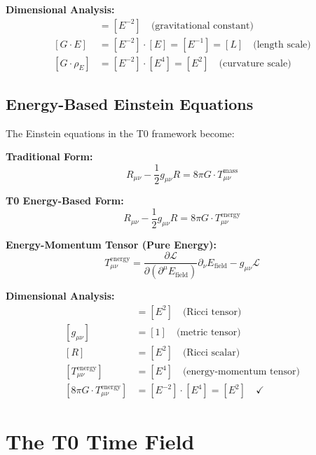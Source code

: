 \documentclass[12pt,a4paper]{report}
\begin{document}
	\textbf{Dimensional Analysis:}
	\begin{align}
		[G] &= [E^{-2}] \quad \text{(gravitational constant)} \\
		[G \cdot E] &= [E^{-2}] \cdot [E] = [E^{-1}] = [L] \quad \text{(length scale)} \\
		[G \cdot \rho_E] &= [E^{-2}] \cdot [E^4] = [E^2] \quad \text{(curvature scale)}
	\end{align}
	
	\subsection{Energy-Based Einstein Equations}
	\label{subsec:energy_einstein_equations}
	
	The Einstein equations in the T0 framework become:
	
	\textbf{Traditional Form:}
	\begin{equation}
		R_{\mu\nu} - \frac{1}{2}g_{\mu\nu}R = 8\pi G \cdot T_{\mu\nu}^{\text{mass}}
	\end{equation}
	
	\textbf{T0 Energy-Based Form:}
	\begin{equation}
		R_{\mu\nu} - \frac{1}{2}g_{\mu\nu}R = 8\pi G \cdot T_{\mu\nu}^{\text{energy}}
	\end{equation}
	
	\textbf{Energy-Momentum Tensor (Pure Energy):}
	\begin{equation}
		T_{\mu\nu}^{\text{energy}} = \frac{\partial \mathcal{L}}{\partial (\partial^\mu E_{\text{field}})} \partial_\nu E_{\text{field}} - g_{\mu\nu} \mathcal{L}
	\end{equation}
	
	\textbf{Dimensional Analysis:}
	\begin{align}
		[R_{\mu\nu}] &= [E^2] \quad \text{(Ricci tensor)} \\
		[g_{\mu\nu}] &= [1] \quad \text{(metric tensor)} \\
		[R] &= [E^2] \quad \text{(Ricci scalar)} \\
		[T_{\mu\nu}^{\text{energy}}] &= [E^4] \quad \text{(energy-momentum tensor)} \\
		[8\pi G \cdot T_{\mu\nu}^{\text{energy}}] &= [E^{-2}] \cdot [E^4] = [E^2] \quad \checkmark
	\end{align}
	
	\section{The T0 Time Field}
	\label{sec:t0_time_field}
\end{document}
